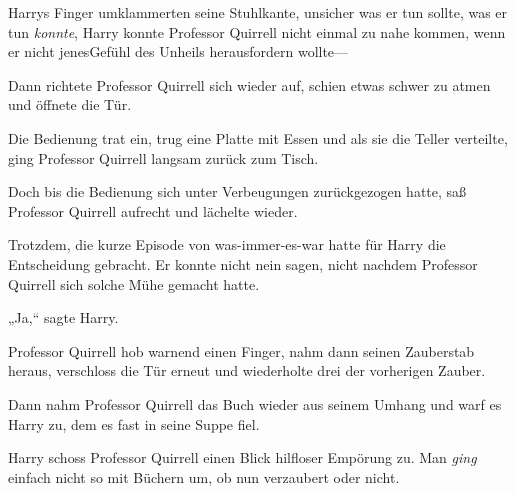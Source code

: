{%
Harrys Finger umklammerten seine Stuhlkante, unsicher was er tun sollte, was er tun \emph{konnte}, Harry konnte Professor Quirrell nicht einmal zu nahe kommen, wenn er nicht jenesGefühl des Unheils herausfordern wollte—

Dann richtete Professor Quirrell sich wieder auf, schien etwas schwer zu atmen und öffnete die Tür.

Die Bedienung trat ein, trug eine Platte mit Essen und als sie die Teller verteilte, ging Professor Quirrell langsam zurück zum Tisch.

Doch bis die Bedienung sich unter Verbeugungen zurückgezogen hatte, saß Professor Quirrell aufrecht und lächelte wieder.

Trotzdem, die kurze Episode von was-immer-es-war hatte für Harry die Entscheidung gebracht. Er konnte nicht nein sagen, nicht nachdem Professor Quirrell sich solche Mühe gemacht hatte.

„Ja,“ sagte Harry.

Professor Quirrell hob warnend einen Finger, nahm dann seinen Zauberstab heraus, verschloss die Tür erneut und wiederholte drei der vorherigen Zauber.

Dann nahm Professor Quirrell das Buch wieder aus seinem Umhang und warf es Harry zu, dem es fast in seine Suppe fiel.

Harry schoss Professor Quirrell einen Blick hilfloser Empörung zu. Man \emph{ging} einfach nicht so mit Büchern um, ob nun verzaubert oder nicht.

}
